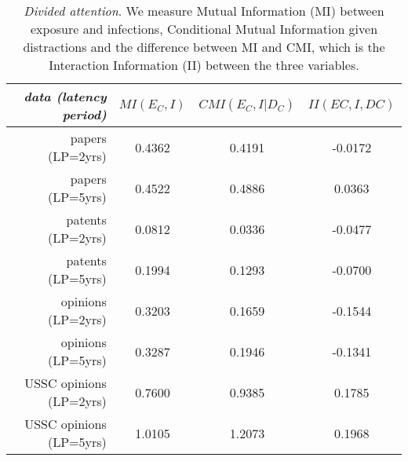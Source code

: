 \documentclass[10pt]{bmc_article}
\newenvironment{bmcformat}{\baselineskip20pt\sloppy\setboolean{publ}{false}}{\baselineskip20pt\sloppy}
\begin{document}
\begin{bmcformat}
\begin{table}
\centering
  \begin{tabular}{|r||c|c|c|}
  \hline
\emph{data (latency period) } &$MI(E_C, I)$ &$CMI(E_C, I | D_C)$ &$II(EC, I, DC)$ \\ \hline%
papers (LP=2yrs)&0.4362&0.4191&-0.0172 \\ %
papers (LP=5yrs)&0.4522&0.4886&0.0363 \\ \hline %
patents (LP=2yrs)&0.0812&0.0336&-0.0477 \\ %
patents (LP=5yrs)&0.1994&0.1293&-0.0700 \\ \hline %
opinions (LP=2yrs)&0.3203&0.1659&-0.1544 \\ %
opinions (LP=5yrs)&0.3287&0.1946&-0.1341 \\ \hline %
USSC opinions (LP=2yrs)&0.7600&0.9385&0.1785 \\ %
USSC opinions (LP=5yrs)&1.0105&1.2073&0.1968 \\ \hline %
  \end{tabular}
   \caption{\emph{Divided attention}. We measure Mutual Information (MI) between exposure and infections, Conditional Mutual Information given distractions and the difference between MI and CMI, which is the Interaction Information (II) between the three variables.
   \label{table:cmi_divided-attention}}
  \end{table}


\end{bmcformat}
\end{document}

